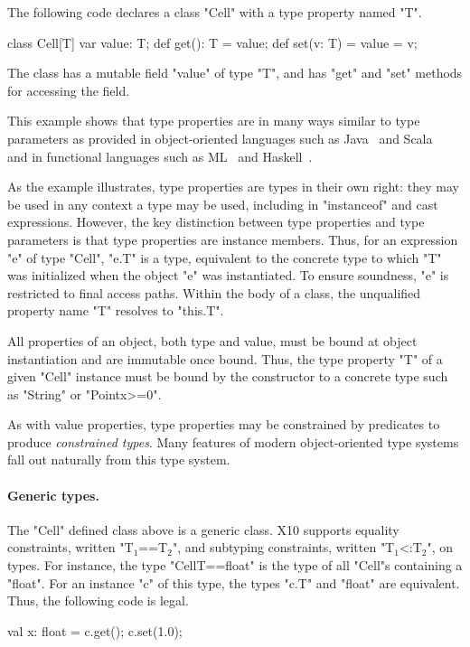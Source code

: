 \documentclass[preprint,nocopyrightspace,9pt]{sigplanconf}
\begin{document}
The following code declares a class \xcd"Cell" with a type
property named \xcd"T".
\begin{xten}
class Cell[T] {
    var value: T;
    def get(): T = value;
    def set(v: T) = { value = v; }
}
\end{xten}
The class has a mutable field \xcd"value" of type \xcd"T",
and has \xcd"get" and \xcd"set" methods for accessing the field.

This example shows that type properties are in many ways similar to
type parameters as provided in object-oriented languages such as
Java~\cite{Java3} and Scala~\cite{scala} and in functional
languages such as ML~\cite{ml} and
Haskell~\cite{haskell}.

As the example illustrates,
type properties are types in their own right:
they may be used in any context a type may be used,
including in \xcd"instanceof" and cast expressions.
%
However, the key distinction between type properties
and type parameters is that type properties are instance
members.
Thus, for an expression \xcd"e" of type \xcd"Cell", \xcd"e.T" is
a type, equivalent to the concrete type to which \xcd"T" was
initialized when the object \xcd"e" was instantiated.
To ensure
soundness, \xcd"e" is restricted to final access paths.
Within the body of a class, the unqualified property name \xcd"T" resolves
to \xcd"this.T".

All properties of an object, both type and value, must be bound at object
instantiation and are immutable once bound.  Thus, the type
property \xcd"T" of a given \xcd"Cell" instance must be bound
by the constructor
to a concrete type such as \xcd"String" or \xcd"Point{x>=0}".

As with value properties, type properties may be constrained
by predicates to produce \emph{constrained types}.
Many features of modern object-oriented type systems fall out
naturally from this type system.

\paragraph{Generic types.}
The \xcd"Cell" defined class above is a generic class.
X10 supports
equality constraints, written \xcdmath"T$_1$==T$_2$", and
subtyping constraints, written \xcdmath"T$_1$<:T$_2$", on types.
For instance,
the type \xcd"Cell{T==float}" is the type of all \xcd"Cell"s
containing a \xcd"float".  For an instance \xcd"c" of this type,
the types \xcd"c.T" and \xcd"float" are equivalent.  Thus, the
following code is legal.
\begin{xten}
val x: float = c.get();
c.set(1.0);
\end{xten}
\end{document}
